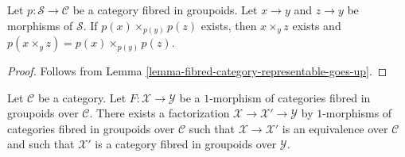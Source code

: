 \begin{lemma}
\label{lemma-fibred-groupoids-fibre-product-goes-up}
Let $p : \mathcal{S} \to \mathcal{C}$ be a category fibred in groupoids.
Let $x \to y$ and $z \to y$ be morphisms of $\mathcal{S}$.
If $p(x) \times_{p(y)} p(z)$ exists, then
$x \times_y z$ exists and $p(x \times_y z) = p(x) \times_{p(y)} p(z)$.
\end{lemma}

\begin{proof}
Follows from
Lemma \ref{lemma-fibred-category-representable-goes-up}.
\end{proof}

\begin{lemma}
\label{lemma-ameliorate-morphism-categories-fibred-groupoids}
Let $\mathcal{C}$ be a category. Let $F : \mathcal{X} \to \mathcal{Y}$
be a $1$-morphism of categories fibred in groupoids over $\mathcal{C}$.
There exists a factorization $\mathcal{X} \to \mathcal{X}' \to \mathcal{Y}$
by $1$-morphisms of categories fibred in groupoids over $\mathcal{C}$ such
that $\mathcal{X} \to \mathcal{X}'$ is an equivalence over $\mathcal{C}$
and such that $\mathcal{X}'$ is a category fibred in groupoids over
$\mathcal{Y}$.
\end{lemma}

